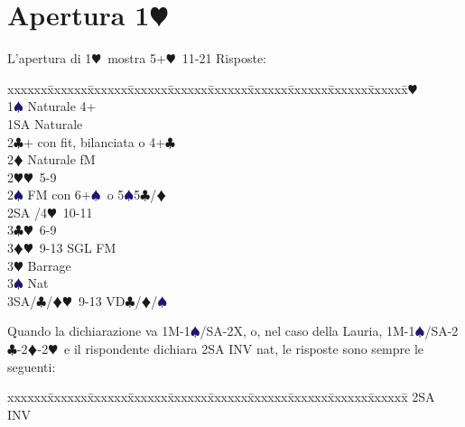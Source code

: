 \documentclass[a4paper,italian]{article}
\newcommand{\BC}{\textcolor{OliveGreen}{$\clubsuit$}}
\newcommand{\BD}{\textcolor{RedOrange}{$\vardiamondsuit$}}
\newcommand{\BH}{\textcolor{Red2}{$\varheartsuit${}}}
\newcommand{\BS}{\textcolor{MidnightBlue}{$\spadesuit${}}}
\newcommand{\pdfh}{\texorpdfstring{\BH{}}{H}}
\newenvironment{bidtable}
{\begin{tabbing}

    xxxxxx\=xxxxxx\=xxxxxx\=xxxxxx\=xxxxxx\=xxxxxx\=xxxxxx\=xxxxxx\=xxxxxx\=xxxxxx\=\kill}
{\end{tabbing} }%
\newenvironment{sviluppi}
{\begin{tcolorbox}[colframe=azzurro,title=Sviluppi particolari]}
    {
\end{tcolorbox} }%
\begin{document}
                                    \section{Apertura 1\pdfh}
                                    \begin{multicols*}{2}
                                        L'apertura di 1\BH\ mostra 5+\BH\ 11-21
                                        Risposte:
                                        \begin{bidtable}
                                            1\BH\+\\
                                            1\BS \>\> Naturale 4+\\
                                            1SA \>\> Naturale\\
                                            2\BC \>+ con fit, bilanciata o 4+\BC \\
                                            2\BD \>\> Naturale fM\\
                                            2\BH \>\BH\ 5-9\\
                                            2\BS \>\> FM con 6+\BS\ o 5\BS 5\BC /\BD \\
                                            2SA \>/4\BH\ 10-11\\
                                            3\BC \>\BH\ 6-9\\
                                            3\BD \>\BH\ 9-13 SGL FM\\
                                            3\BH \>\> Barrage\\
                                            3\BS \>\> Nat\\
                                            3SA/\BC/\BD \>\BH\ 9-13 VD\BC /\BD /\BS \-
                                        \end{bidtable}
                                        \begin{sviluppi}\label{1Maggiore}
                                            Quando la dichiarazione va 1M-1\BS/SA-2X, o, nel caso della Lauria, 1M-1\BS/SA-2\BC-2\BD-2\BH\ e il rispondente dichiara 2SA INV nat, le risposte sono sempre le seguenti:
                                            \smallbreak
                                            \begin{bidtable}
                                                2SA \> INV\+\\

\end{bidtable}
\end{sviluppi}
\end{multicols*}
\end{document}
